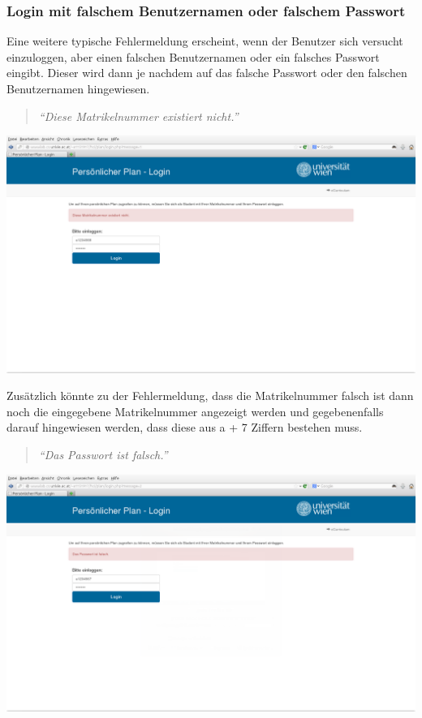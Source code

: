 \documentclass[a4paper,10pt]{scrartcl}
\begin{document}
\subsubsection*{Login mit falschem Benutzernamen oder falschem Passwort}

Eine weitere typische Fehlermeldung erscheint, wenn der Benutzer sich versucht einzuloggen, aber einen falschen Benutzernamen oder ein falsches Passwort eingibt.
Dieser wird dann je nachdem auf das falsche Passwort oder den falschen Benutzernamen hingewiesen.

\begin{quote}
 \textit{``Diese Matrikelnummer existiert nicht.''}
\end{quote} 

\begin{center}
 \includegraphics[scale=0.4]{./fehlermeldung2.png}
\end{center}

Zusätzlich könnte zu der Fehlermeldung, dass die Matrikelnummer falsch ist dann noch die eingegebene Matrikelnummer angezeigt werden und gegebenenfalls darauf hingewiesen
werden, dass diese aus a + 7 Ziffern bestehen muss.

\begin{quote}
 \textit{``Das Passwort ist falsch.''}
\end{quote} 

\begin{center}
 \includegraphics[scale=0.4]{./fehlermeldung3.png}
\end{center}
\end{document}
